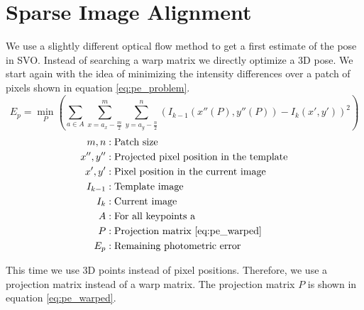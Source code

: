 \documentclass[11pt,a4paper,titlepage,oneside]{report}
\begin{document}
\section{Sparse Image Alignment}\label{sec:pose_estimation}
We use a slightly different optical flow method to get a first estimate of the pose in SVO. Instead of searching a warp matrix we directly optimize a 3D pose. We start again with the idea of minimizing the intensity differences over a patch of pixels shown in equation \ref{eq:pe_problem}.
\begin{equation}\label{eq:pe_problem}
  E_p=\min_P(\sum_{a \in A}\sum_{x=a_x-\frac{m}{2}}^m\sum_{y=a_y-\frac{n}{2}}^n(I_{k-1}(x''(P),y''(P))-I_{k}(x',y'))^2)
\end{equation}
\begin{align*}
  m,n       &: \text{Patch size}\\
  x'',y''   &: \text{Projected pixel position in the template}\\
  x',y'     &: \text{Pixel position in the current image}\\
  I_{k-1}   &: \text{Template image}\\
  I_{k}     &: \text{Current image}\\
  A         &: \text{For all keypoints a}\\
  P         &: \text{Projection matrix \ref{eq:pe_warped}}\\
  E_p       &: \text{Remaining photometric error}
\end{align*}

This time we use 3D points instead of pixel positions. Therefore, we use a projection matrix instead of a warp matrix. The projection matrix $P$ is shown in equation \ref{eq:pe_warped}. 
\end{document}
